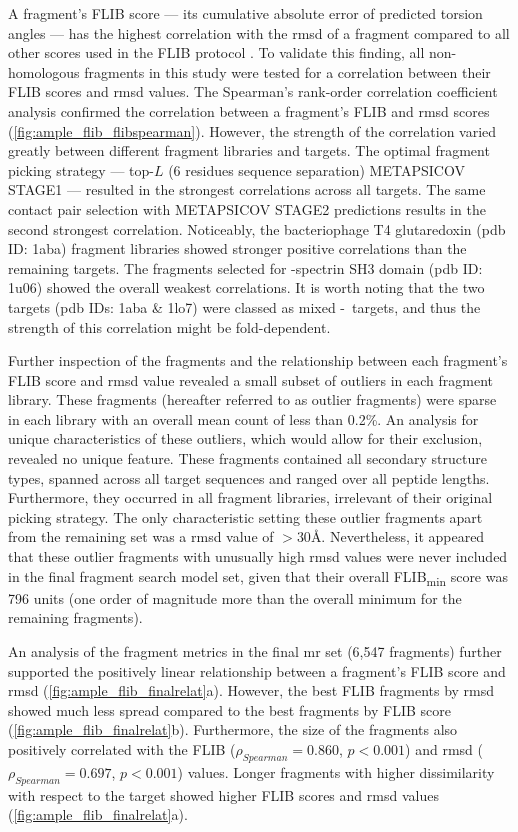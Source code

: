A fragment's FLIB score --- its cumulative absolute error of predicted torsion angles --- has the highest correlation with the \gls{rmsd} of a fragment compared to all other scores used in the FLIB protocol \cite{De_Oliveira2015-kb}. To validate this finding, all non-homologous fragments in this study were tested for a correlation between their FLIB scores and \gls{rmsd} values. The Spearman's rank-order correlation coefficient analysis confirmed the correlation between a fragment's FLIB and \gls{rmsd} scores (\cref{fig:ample_flib_flibspearman}). However, the strength of the correlation varied greatly between different fragment libraries and targets. The optimal fragment picking strategy --- top-$L$ (6 residues sequence separation) METAPSICOV STAGE1 --- resulted in the strongest correlations across all targets. The same contact pair selection with METAPSICOV STAGE2 predictions results in the second strongest correlation. Noticeably, the bacteriophage T4 glutaredoxin (\gls{pdb} ID: 1aba) fragment libraries showed stronger positive correlations than the remaining targets. The fragments selected for \textalpha-spectrin SH3 domain (\gls{pdb} ID: 1u06) showed the overall weakest correlations. It is worth noting that the two targets (\gls{pdb} IDs: 1aba \& 1lo7) were classed as mixed \textalpha-\textbeta\ targets, and thus the strength of this correlation might be fold-dependent.

Further inspection of the fragments and the relationship between each fragment's FLIB score and \gls{rmsd} value revealed a small subset of outliers in each fragment library. These fragments (hereafter referred to as outlier fragments) were sparse in each library with an overall mean count of less than 0.2\%. An analysis for unique characteristics of these outliers, which would allow for their exclusion, revealed no unique feature. These fragments contained all secondary structure types, spanned across all target sequences and ranged over all peptide lengths. Furthermore, they occurred in all fragment libraries, irrelevant of their original picking strategy. The only characteristic setting these outlier fragments apart from the remaining set was a \gls{rmsd} value of $>30$\AA. Nevertheless, it appeared that these outlier fragments with unusually high \gls{rmsd} values were never included in the final fragment search model set, given that their overall FLIB\textsubscript{min} score was 796 units (one order of magnitude more than the overall minimum for the remaining fragments).

An analysis of the fragment metrics in the final \gls{mr} set (6,547 fragments) further supported the positively linear relationship between a fragment's FLIB score and \gls{rmsd} (\cref{fig:ample_flib_finalrelat}a). However, the best FLIB fragments by \gls{rmsd} showed much less spread compared to the best fragments by FLIB score (\cref{fig:ample_flib_finalrelat}b). Furthermore, the size of the fragments also positively correlated with the FLIB ($\rho_{Spearman}=0.860$, $p<0.001$) and \gls{rmsd} ($\rho_{Spearman}=0.697$, $p<0.001$) values. Longer fragments with higher dissimilarity with respect to the target showed higher FLIB scores and \gls{rmsd} values (\cref{fig:ample_flib_finalrelat}a). 


